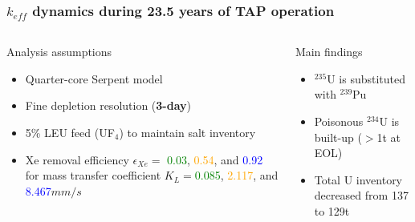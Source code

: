 \begin{frame}
\frametitle{$k_{eff}$ dynamics during 23.5 years of TAP operation}
\vspace{-3mm}
\begin{columns}
	\column{4.3cm}
	\begin{block}{Analysis assumptions}
		\fontsize{7}{9}\selectfont
		\begin{itemize}
			\item Quarter-core Serpent model
			\item Fine depletion resolution (\textbf{3-day})
			\item 5\% LEU feed (UF$_4$) to maintain salt inventory
			\item Xe removal efficiency $\epsilon_{Xe}=$\textcolor{green}{
			0.03}, \textcolor{orange}{0.54}, and \textcolor{blue}{0.92} for 
			mass transfer coefficient $K_L=$\textcolor{green}{0.085}, 
			\textcolor{orange}{2.117}, and \textcolor{blue}{8.467}$mm/s$
		\end{itemize}
	\end{block}
	\vspace{-2mm}
	\begin{block}{Main findings}
		\fontsize{7}{9}\selectfont
		\begin{itemize}
			\item $^{235}$U is substituted with $^{239}$Pu
			\item Poisonous $^{234}$U is built-up ($>$1t at EOL)
			\item Total U inventory decreased from 137 to 129t
		\end{itemize}  
	\end{block}  	
	

\end{columns}
\end{frame}
